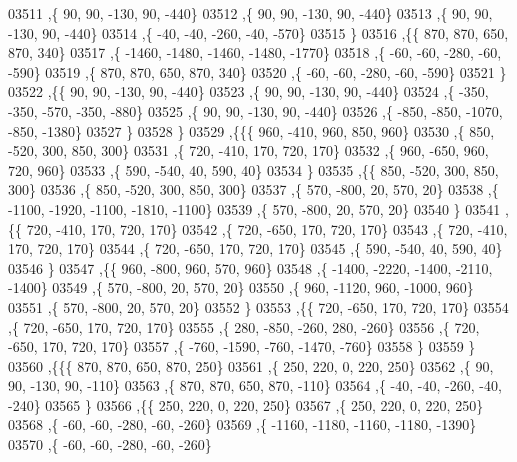\begin{DoxyCode}
03511     ,\{    90,    90,  -130,    90,  -440\}
03512     ,\{    90,    90,  -130,    90,  -440\}
03513     ,\{    90,    90,  -130,    90,  -440\}
03514     ,\{   -40,   -40,  -260,   -40,  -570\}
03515     \}
03516    ,\{\{   870,   870,   650,   870,   340\}
03517     ,\{ -1460, -1480, -1460, -1480, -1770\}
03518     ,\{   -60,   -60,  -280,   -60,  -590\}
03519     ,\{   870,   870,   650,   870,   340\}
03520     ,\{   -60,   -60,  -280,   -60,  -590\}
03521     \}
03522    ,\{\{    90,    90,  -130,    90,  -440\}
03523     ,\{    90,    90,  -130,    90,  -440\}
03524     ,\{  -350,  -350,  -570,  -350,  -880\}
03525     ,\{    90,    90,  -130,    90,  -440\}
03526     ,\{  -850,  -850, -1070,  -850, -1380\}
03527     \}
03528    \}
03529   ,\{\{\{   960,  -410,   960,   850,   960\}
03530     ,\{   850,  -520,   300,   850,   300\}
03531     ,\{   720,  -410,   170,   720,   170\}
03532     ,\{   960,  -650,   960,   720,   960\}
03533     ,\{   590,  -540,    40,   590,    40\}
03534     \}
03535    ,\{\{   850,  -520,   300,   850,   300\}
03536     ,\{   850,  -520,   300,   850,   300\}
03537     ,\{   570,  -800,    20,   570,    20\}
03538     ,\{ -1100, -1920, -1100, -1810, -1100\}
03539     ,\{   570,  -800,    20,   570,    20\}
03540     \}
03541    ,\{\{   720,  -410,   170,   720,   170\}
03542     ,\{   720,  -650,   170,   720,   170\}
03543     ,\{   720,  -410,   170,   720,   170\}
03544     ,\{   720,  -650,   170,   720,   170\}
03545     ,\{   590,  -540,    40,   590,    40\}
03546     \}
03547    ,\{\{   960,  -800,   960,   570,   960\}
03548     ,\{ -1400, -2220, -1400, -2110, -1400\}
03549     ,\{   570,  -800,    20,   570,    20\}
03550     ,\{   960, -1120,   960, -1000,   960\}
03551     ,\{   570,  -800,    20,   570,    20\}
03552     \}
03553    ,\{\{   720,  -650,   170,   720,   170\}
03554     ,\{   720,  -650,   170,   720,   170\}
03555     ,\{   280,  -850,  -260,   280,  -260\}
03556     ,\{   720,  -650,   170,   720,   170\}
03557     ,\{  -760, -1590,  -760, -1470,  -760\}
03558     \}
03559    \}
03560   ,\{\{\{   870,   870,   650,   870,   250\}
03561     ,\{   250,   220,     0,   220,   250\}
03562     ,\{    90,    90,  -130,    90,  -110\}
03563     ,\{   870,   870,   650,   870,  -110\}
03564     ,\{   -40,   -40,  -260,   -40,  -240\}
03565     \}
03566    ,\{\{   250,   220,     0,   220,   250\}
03567     ,\{   250,   220,     0,   220,   250\}
03568     ,\{   -60,   -60,  -280,   -60,  -260\}
03569     ,\{ -1160, -1180, -1160, -1180, -1390\}
03570     ,\{   -60,   -60,  -280,   -60,  -260\}

\end{DoxyCode}
